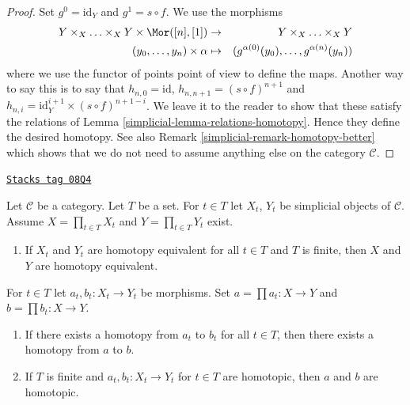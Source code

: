 \begin{proof}

Set $g^0 = \text{id}_Y$ and $g^1 = s \circ f$.
We use the morphisms
\begin{eqnarray*}
Y \times_X \ldots \times_X Y \times \Mor([n], [1])
& \to &
Y \times_X \ldots \times_X Y \\
(y_0, \ldots, y_n) \times \alpha
& \mapsto &
(g^{\alpha(0)}(y_0), \ldots, g^{\alpha(n)}(y_n))
\end{eqnarray*}
where we use the functor of points point of view to define the maps.
Another way to say this is to say that
$h_{n, 0} = \text{id}$, $h_{n, n + 1} = (s \circ f)^{n + 1}$ and
$h_{n, i} = \text{id}_Y^{i + 1} \times (s \circ f)^{n + 1 - i}$.
We leave it to the reader to show that these satisfy the relations
of Lemma \ref{simplicial-lemma-relations-homotopy}. Hence they define
the desired homotopy. See also Remark \ref{simplicial-remark-homotopy-better}
which shows that
we do not need to assume anything else on the category $\mathcal{C}$.
\end{proof}

\begin{lemma}
\label{simplicial-lemma-products-homotopy}
\href{https://stacks.math.columbia.edu/tag/08Q4}{\texttt{Stacks tag 08Q4}}

Let $\mathcal{C}$ be a category. Let $T$ be a set. For $t \in T$
let $X_t$, $Y_t$ be simplicial objects of $\mathcal{C}$. Assume
$X = \prod_{t \in T} X_t$ and $Y = \prod_{t \in T} Y_t$ exist.
\begin{enumerate}
\item If $X_t$ and $Y_t$ are homotopy equivalent for all $t \in T$
and $T$ is finite, then $X$ and $Y$ are homotopy equivalent.
\end{enumerate}
For $t \in T$ let $a_t, b_t : X_t \to Y_t$ be morphisms.
Set $a = \prod a_t : X \to Y$ and $b = \prod b_t : X \to Y$.
\begin{enumerate}
\item[(2)] If there exists a homotopy from $a_t$ to $b_t$ for
all $t \in T$, then there exists a homotopy from $a$ to $b$.
\item[(3)] If $T$ is finite and $a_t, b_t : X_t \to Y_t$ for $t \in T$
are homotopic, then $a$ and $b$ are homotopic.
\end{enumerate}
\end{lemma}

